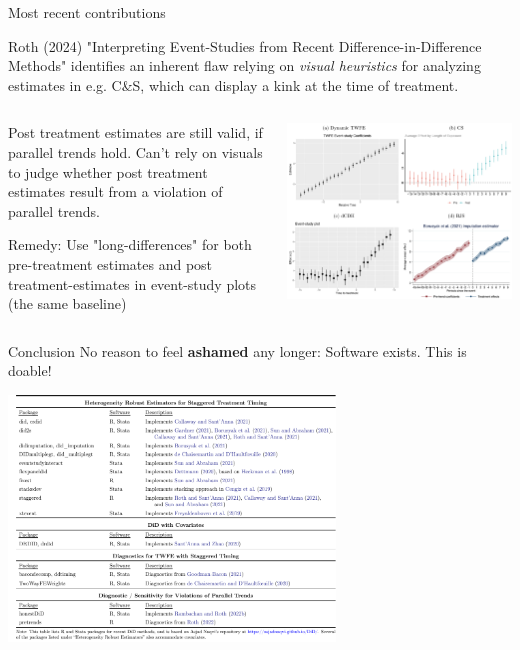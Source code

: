 \documentclass[notes,11pt, aspectratio=169]{beamer}
\newenvironment{wideitemize}{\itemize\addtolength{\itemsep}{10pt}}{\enditemize}
\begin{document}
\begin{frame}{Most recent contributions}
\begin{wideitemize}
    \item Roth (2024) "Interpreting Event-Studies from Recent Difference-in-Difference Methods" identifies an inherent flaw relying on \emph{visual heuristics} for analyzing estimates in e.g. C\&S, which can display a kink at the time of treatment. 
\end{wideitemize}
  \begin{columns}[T] %
    \begin{column}{.4\textwidth}
    \begin{wideitemize}
        \item Post treatment estimates are still valid, if parallel trends hold. Can't rely on visuals to judge whether post treatment estimates result from a violation of parallel trends.  
        \item Remedy: Use "long-differences" for both pre-treatment estimates and post treatment-estimates in event-study plots (the same baseline)
        
    \end{wideitemize}
    \end{column}%
    \hfill%
    \begin{column}{.6\textwidth}
       \includegraphics[width=0.9\linewidth]{Event_Roth.png}                 
    \end{column}%
    \end{columns}       
\end{frame}


\begin{frame}{Conclusion}
No reason to feel \textbf{ashamed} any longer: Software exists. This is doable!
    \begin{center}
     \includegraphics[width=0.65\textwidth]{PAckages.png}
    \end{center}   
\end{frame}
\end{document}
